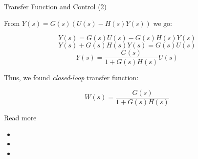 \documentclass{beamer}
\begin{document}
\begin{frame}{Transfer Function and Control (2)}
	\begin{flushleft}
		
		From $Y(s)  = G(s) (U(s)  - H(s) Y(s) )$ we go:
		
		\begin{equation}
			Y(s)  = G(s)U(s) - G(s)H(s) Y(s) 
		\end{equation}
		\begin{equation}
			Y(s)  + G(s)H(s) Y(s)  = G(s)U(s)
		\end{equation}
		\begin{equation}
			Y(s)  = \frac{G(s)}{1 + G(s)H(s)} U(s)
		\end{equation}
		
		Thus, we found \emph{closed-loop} transfer function:
		
		\begin{equation}
			W(s) = \frac{G(s)}{1 + G(s)H(s)}
		\end{equation}
		
	\end{flushleft}
\end{frame}



\begin{frame}{Read more}

\begin{itemize}
\item {}

\item {}

\item {}

\end{itemize}

\end{frame}



\myqrframe
\end{document}
